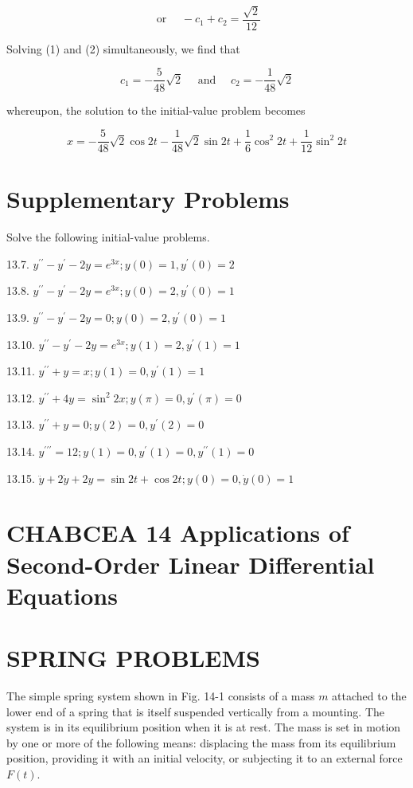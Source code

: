 \documentclass[10pt]{article}
\begin{document}
\begin{equation*}
\text { or } \quad-c_{1}+c_{2}=\frac{\sqrt{2}}{12} \tag{2}
\end{equation*}


Solving (1) and (2) simultaneously, we find that

$$
c_{1}=-\frac{5}{48} \sqrt{2} \quad \text { and } \quad c_{2}=-\frac{1}{48} \sqrt{2}
$$

whereupon, the solution to the initial-value problem becomes

$$
x=-\frac{5}{48} \sqrt{2} \cos 2 t-\frac{1}{48} \sqrt{2} \sin 2 t+\frac{1}{6} \cos ^{2} 2 t+\frac{1}{12} \sin ^{2} 2 t
$$

\section*{Supplementary Problems}
Solve the following initial-value problems.

13.7. $y^{\prime \prime}-y^{\prime}-2 y=e^{3 x} ; y(0)=1, y^{\prime}(0)=2$

13.8. $y^{\prime \prime}-y^{\prime}-2 y=e^{3 x} ; y(0)=2, y^{\prime}(0)=1$

13.9. $y^{\prime \prime}-y^{\prime}-2 y=0 ; y(0)=2, y^{\prime}(0)=1$

13.10. $y^{\prime \prime}-y^{\prime}-2 y=e^{3 x} ; y(1)=2, y^{\prime}(1)=1$

13.11. $y^{\prime \prime}+y=x ; y(1)=0, y^{\prime}(1)=1$

13.12. $y^{\prime \prime}+4 y=\sin ^{2} 2 x ; y(\pi)=0, y^{\prime}(\pi)=0$

13.13. $y^{\prime \prime}+y=0 ; y(2)=0, y^{\prime}(2)=0$

13.14. $y^{\prime \prime \prime}=12 ; y(1)=0, y^{\prime}(1)=0, y^{\prime \prime}(1)=0$

13.15. $\ddot{y}+2 \dot{y}+2 y=\sin 2 t+\cos 2 t ; y(0)=0, \dot{y}(0)=1$

\section*{CHABCEA 14 Applications of Second-Order Linear Differential Equations}
\section*{SPRING PROBLEMS}
The simple spring system shown in Fig. 14-1 consists of a mass $m$ attached to the lower end of a spring that is itself suspended vertically from a mounting. The system is in its equilibrium position when it is at rest. The mass is set in motion by one or more of the following means: displacing the mass from its equilibrium position, providing it with an initial velocity, or subjecting it to an external force $F(t)$.
\end{document}
